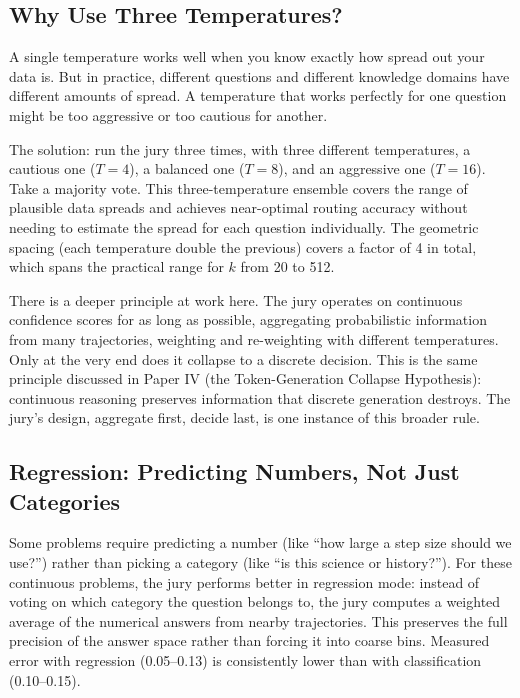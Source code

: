 \documentclass[11pt]{article}
\begin{document}
\subsection{Why Use Three Temperatures?}

A single temperature works well when you know exactly how spread out your
data is. But in practice, different questions and different knowledge domains
have different amounts of spread. A temperature that works perfectly for one
question might be too aggressive or too cautious for another.

The solution: run the jury three times, with three different temperatures, a
cautious one ($T=4$), a balanced one ($T=8$), and an aggressive one ($T=16$).
Take a majority vote. This three-temperature ensemble covers the range of
plausible data spreads and achieves near-optimal routing accuracy without
needing to estimate the spread for each question individually. The geometric
spacing (each temperature double the previous) covers a factor of 4 in total,
which spans the practical range for $k$ from 20 to 512.

There is a deeper principle at work here. The jury operates on continuous
confidence scores for as long as possible, aggregating probabilistic
information from many trajectories, weighting and re-weighting with different
temperatures. Only at the very end does it collapse to a discrete decision.
This is the same principle discussed in Paper IV (the Token-Generation
Collapse Hypothesis): continuous reasoning preserves information that
discrete generation destroys. The jury's design, aggregate first, decide
last, is one instance of this broader rule.

\subsection{Regression: Predicting Numbers, Not Just Categories}

Some problems require predicting a number (like ``how large a step size should
we use?'') rather than picking a category (like ``is this science or
history?''). For these continuous problems, the jury performs better in
regression mode: instead of voting on which category the question
belongs to, the jury computes a weighted average of the numerical answers from
nearby trajectories. This preserves the full precision of the answer space
rather than forcing it into coarse bins. Measured error with regression
(0.05--0.13) is consistently lower than with classification (0.10--0.15).
\end{document}

